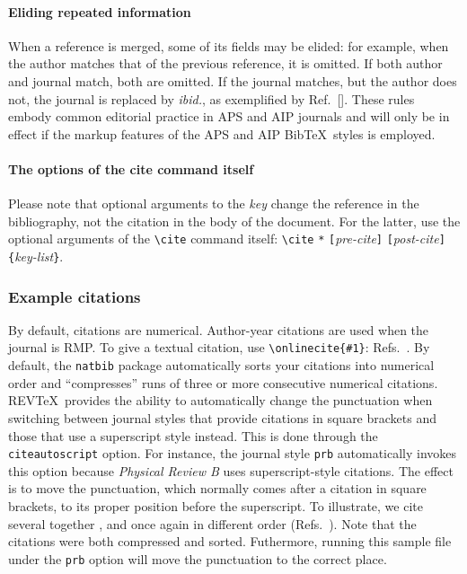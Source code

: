 \documentclass[%
 reprint,
 amsmath,amssymb,
 aps,
]{revtex4-2}
\begin{document}
\paragraph{Eliding repeated information}
When a reference is merged, some of its fields may be elided: for example, 
when the author matches that of the previous reference, it is omitted. 
If both author and journal match, both are omitted.
If the journal matches, but the author does not, the journal is replaced by \emph{ibid.},
as exemplified by Ref.~[]. 
These rules embody common editorial practice in APS and AIP journals and will only
be in effect if the markup features of the APS and AIP Bib\TeX\ styles is employed.

\paragraph{The options of the cite command itself}
Please note that optional arguments to the \emph{key} change the reference in the bibliography, 
not the citation in the body of the document. 
For the latter, use the optional arguments of the \verb+\cite+ command itself:
\verb+\cite+ \texttt{*}\allowbreak
\texttt{[}\emph{pre-cite}\texttt{]}\allowbreak
\texttt{[}\emph{post-cite}\texttt{]}\allowbreak
\verb+{+\emph{key-list}\verb+}+.

\subsubsection{Example citations}
By default, citations are numerical\cite{Beutler1994}.
Author-year citations are used when the journal is RMP. 
To give a textual citation, use \verb+\onlinecite{#1}+: 
Refs.~. 
By default, the \texttt{natbib} package automatically sorts your citations into numerical order and ``compresses'' runs of three or more consecutive numerical citations.
REV\TeX\ provides the ability to automatically change the punctuation when switching between journal styles that provide citations in square brackets and those that use a superscript style instead. This is done through the \texttt{citeautoscript} option. For instance, the journal style \texttt{prb} automatically invokes this option because \textit{Physical 
Review B} uses superscript-style citations. The effect is to move the punctuation, which normally comes after a citation in square brackets, to its proper position before the superscript. 
To illustrate, we cite several together 
\cite{[See the explanation of time travel in ]feyn54,*[The classical relativistic treatment of ][ is a relative classic]epr,witten2001,Berman1983,Davies1998,Bire82}, 
and once again in different order (Refs.~\cite{epr,feyn54,Bire82,Berman1983,witten2001,Davies1998}). 
Note that the citations were both compressed and sorted. Futhermore, running this sample file under the \texttt{prb} option will move the punctuation to the correct place.
\end{document}
